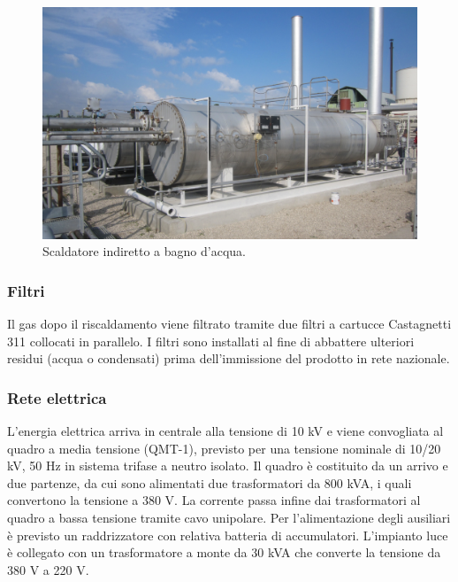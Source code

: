\begin{figure}[htbp] %
    \centering
    \includegraphics[width=.7\textwidth]{fig/test/centrale/scaldatore}
    \caption{Scaldatore indiretto a bagno d'acqua.} 
    \label{fig:scaldatore}
\end{figure}

\subsubsection*{Filtri}
Il gas dopo il riscaldamento viene filtrato tramite due filtri a cartucce Castagnetti 311 collocati in parallelo. I filtri sono installati al fine di abbattere ulteriori residui (acqua o condensati) prima dell'immissione del prodotto in rete nazionale.


\subsubsection*{Rete elettrica}
L'energia elettrica arriva in centrale alla tensione di 10 kV e viene convogliata al quadro a media tensione (QMT-1), previsto per una tensione nominale di 10/20 kV, 50 Hz in sistema trifase a neutro isolato. Il quadro è costituito da un arrivo e due partenze, da cui sono alimentati due trasformatori da 800 kVA, i quali convertono la tensione a 380 V. La corrente passa infine dai trasformatori al quadro a bassa tensione tramite cavo unipolare. Per l'alimentazione degli ausiliari è previsto un raddrizzatore con relativa batteria di accumulatori. L'impianto luce è collegato con un trasformatore a monte da 30 kVA che converte la tensione da 380 V a 220 V.

